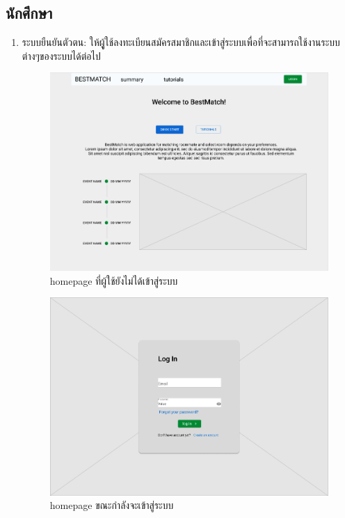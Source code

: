 \subsection{นักศึกษา}
\begin{enumerate}
\item ระบบยืนยันตัวตน: ให้ผูู้ใช้ลงทะเบียนสมัครสมาชิกและเข้าสู่ระบบเพื่อที่จะสามารถใช้งานระบบต่างๆของระบบได้ต่อไป
\begin{figure}[h]
\begin{center}
\includegraphics[width=\linewidth]{photo/student/home.png}
\end{center}
\caption{homepage ที่ผู้ใช้ยังไม่ได้เข้าสู่ระบบ}
\label{fig:hp-no-auth}
\end{figure}

  \begin{figure}[h]
  \begin{center}
  \includegraphics[width=\linewidth]{photo/student/login.png}
  \end{center}
  \caption{homepage ขณะกำลังจะเข้าสู่ระบบ}
  \label{fig:hp-login}
  \end{figure}


\end{enumerate}
